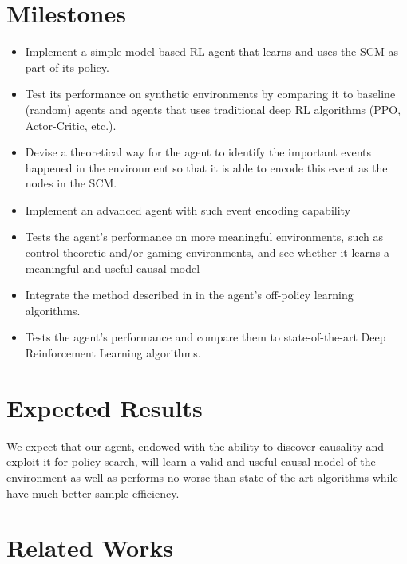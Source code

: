 \documentclass{article}
\begin{document}
\section{Milestones}
\begin{itemize}
  \item Implement a simple model-based RL agent that learns and uses the SCM as part of its policy.
  \item Test its performance on synthetic environments by comparing it to baseline (random) agents and agents that uses traditional deep RL algorithms (PPO, Actor-Critic, etc.).
  \item Devise a theoretical way for the agent to identify the important events happened in the environment so that it is able to encode this event as the nodes in the SCM.
  \item Implement an advanced agent with such event encoding capability 
  \item Tests the agent's performance on more meaningful environments, such as control-theoretic and/or gaming environments, and see whether it learns a meaningful and useful causal model
  \item Integrate the method described in \cite{buesing2018woulda} in the agent's off-policy learning algorithms.
  \item Tests the agent's performance and compare them to state-of-the-art Deep Reinforcement Learning algorithms. 
\end{itemize}

\section{Expected Results}

We expect that our agent, endowed with the ability to discover causality and exploit it for policy search, will learn a valid and useful causal model of the environment as well as performs no worse than state-of-the-art algorithms while have much better sample efficiency. 

\section{Related Works}
\cite{2017arXiv170706170P}
\cite{2017arXiv171108936G}
\cite{2018arXiv180206310Y}
\cite{2018arXiv180500909L}
\cite{2018arXiv180509044L}
\cite{2018arXiv180701268G}
\cite{2018arXiv180709341K}
\cite{2018arXiv180904506F}
\cite{2018arXiv181208434Z}
\cite{2019arXiv190108162D}
\cite{2019arXiv190109895M}
\cite{Budhathoki2018RuleDF}
\cite{DBLP:journals/corr/abs-1805-00909}
\cite{GERSHMAN201543}
\cite{Gershman2017ReinforcementLA}
\cite{Pearl:2009:CMR:1642718}
\cite{Pearl:2018:BWN:3238230}
\cite{Pim2018CausalConfusion}
\cite{buesing2018woulda}


  
 
\end{document}
